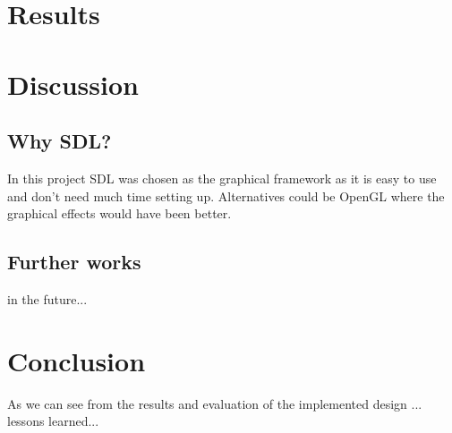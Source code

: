 \documentclass[12pt, a4paper, oneside]{article}
\begin{document}
\section{Results}
\section{Discussion}
\subsection{Why SDL?}
In this project SDL was chosen as the graphical framework as it is easy to use and don't need much time setting up. Alternatives could be OpenGL where the graphical effects would have been better. 

\subsection{Further works}
in the future...

\section{Conclusion}
As we can see from the results and evaluation of the implemented design ...
lessons learned...

\newpage




\end{document}
